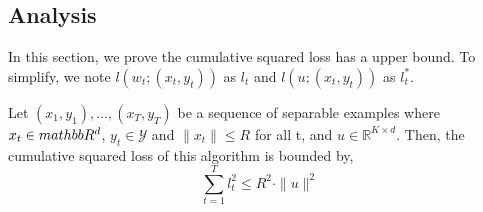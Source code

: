 \subsection{Analysis}
\label{subsec:BPAA}
In this section, we prove the cumulative squared loss has a upper bound. To simplify, we note $l(w_t;(x_t,y_t))$ as $l_t$ and $l(u;(x_t,y_t))$ as $l_t^{\ast}$.
\begin{theo}
\label{theo:BPAT1}
Let $(x_1,y_1),...,(x_T,y_T)$ be a sequence of separable examples where $x_t \in \\mathbb{R}^d$, $y_t\in \mathscr{Y}$ and $\parallel{x_t}\parallel\leqslant R$ for all t, and $u \in \mathbb{R}^{K\times d}$. Then, the cumulative squared loss of this algorithm is bounded by,
\begin{equation}
\sum_{t=1}^{T} l_t^2 \leqslant R^2\cdot \parallel{u}\parallel^2
\end{equation}
\end{theo}

